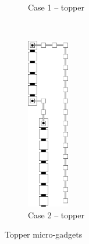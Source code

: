 \begin{figure}[H]
\begin{subfigure}[t]{0.2\textwidth}
        \caption{\label{fig:topper_case1} Case 1 -- topper}
    \end{subfigure}%
    ~
    \begin{subfigure}[t]{0.2\textwidth}
        \centering
        \includegraphics[width=0.2\textwidth]{digit_tops/digit_top_case2_digit2_topper}
        \caption{\label{fig:topper_case2} Case 2 -- topper}
    \end{subfigure}%
    \caption{\label{fig:topper_microgadgets} Topper micro-gadgets }
\end{figure}


